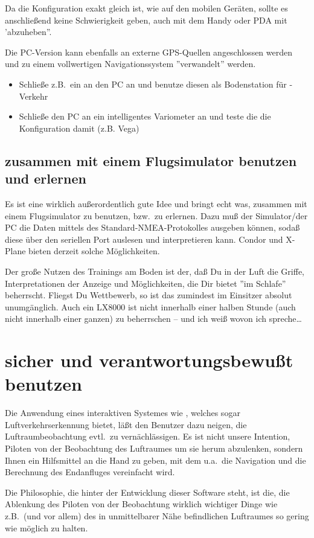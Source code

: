 Da die Konfiguration exakt gleich ist, wie auf den mobilen Geräten, sollte es anschließend keine Schwierigkeit geben,
auch mit dem Handy oder PDA mit \xc 'abzuheben''.


Die PC-Version kann ebenfalls an externe GPS-Quellen angeschlossen werden und zu einem 
vollwertigen Navigationssystem ''verwandelt'' werden. 


\begin{itemize}
\item Schließe z.B.\ ein \fl an den PC an und benutze diesen als Bodenstation für \fl-Verkehr
\item Schließe den PC an ein intelligentes Variometer an und teste die die Konfiguration damit  (z.B. Vega)
\end{itemize}

\subsection*{\xc zusammen mit einem Flugsimulator benutzen und erlernen}
Es ist eine wirklich außerordentlich gute Idee und bringt echt was, \xc zusammen mit einem Flugsimulator zu benutzen, bzw.\ zu erlernen.
Dazu muß der Simulator/der PC die Daten mittels des Standard-NMEA-Protokolles ausgeben können, sodaß  \xc diese über den seriellen Port auslesen und interpretieren kann.
{\sc Condor} und {\sc X-Plane} bieten derzeit solche Möglichkeiten.  

Der große Nutzen des Trainings am Boden ist der, daß Du in der Luft die Griffe, Interpretationen der Anzeige und Möglichkeiten, 
die Dir \xc bietet ''im Schlafe'' beherrscht. Fliegst Du Wettbewerb, so ist das zumindest im Einsitzer absolut unumgänglich.
Auch ein LX8000 ist nicht innerhalb einer halben Stunde (auch nicht innerhalb einer ganzen) zu beherrschen -- und ich weiß wovon ich spreche\dots


\section{\xc sicher und verantwortungsbewußt benutzen}
Die Anwendung eines interaktiven Systemes wie  \xc, welches sogar Luftverkehrserkennung bietet, läßt den Benutzer dazu neigen, die Luftraumbeobachtung evtl.\ zu vernächlässigen. 
Es ist nicht unsere Intention, Piloten von der Beobachtung des Luftraumes um sie herum abzulenken,  sondern Ihnen  ein Hilfsmittel an die Hand zu geben,
mit dem u.a.\ die Navigation  und die Berechnung  des Endanfluges vereinfacht wird.

Die Philosophie, die hinter der Entwicklung dieser Software steht, ist die, die Ablenkung des Piloten von der Beobachtung wirklich wichtiger Dinge
wie z.B.\ (und vor allem) des in unmittelbarer Nähe befindlichen Luftraumes so gering wie möglich zu halten.

